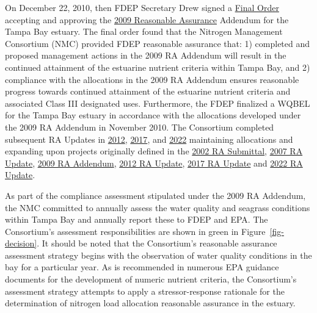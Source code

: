 \documentclass[
  letterpaper,
  DIV=11,
  numbers=noendperiod]{scrreprt}
\begin{document}
On December 22, 2010, then FDEP Secretary Drew signed a
\href{https://drive.google.com/file/d/1wV3w8ack_fLNK3yS-xTR7LTmziNtZ8CN/view?usp=share_link}{Final
Order} accepting and approving the
\href{https://drive.google.com/file/d/10IjJAfcGFf007a5VdPXAUtUi4dx-cmsA/view?usp=drivesdk}{2009
Reasonable Assurance} Addendum for the Tampa Bay estuary. The final
order found that the Nitrogen Management Consortium (NMC) provided FDEP
reasonable assurance that: 1) completed and proposed management actions
in the 2009 RA Addendum will result in the continued attainment of the
estuarine nutrient criteria within Tampa Bay, and 2) compliance with the
allocations in the 2009 RA Addendum ensures reasonable progress towards
continued attainment of the estuarine nutrient criteria and associated
Class III designated uses. Furthermore, the FDEP finalized a WQBEL for
the Tampa Bay estuary in accordance with the allocations developed under
the 2009 RA Addendum in November 2010. The Consortium completed
subsequent RA Updates in
\href{https://tbep.org/reasonable-assurance-plans-updates-2012/}{2012},
\href{https://tbep.org/reasonable-assurance-plans-updates-2017/}{2017},
and
\href{https://drive.google.com/file/d/18HHMx4U6vHNrFyepEFuoTJ_sEKyTA_gu/view?usp=share_link}{2022}
maintaining allocations and expanding upon projects originally defined
in the
\href{https://tbep.org/reasonable-assurance-plans-updates-2002/}{2002 RA
Submittal},
\href{https://tbep.org/reasonable-assurance-plans-updates-2007/}{2007 RA
Update},
\href{https://drive.google.com/file/d/10IjJAfcGFf007a5VdPXAUtUi4dx-cmsA/view?usp=drivesdk}{2009
RA Addendum},
\href{https://drive.google.com/file/d/1F_QmQcvGVQ78wK3jcMLMGmjs1vJ21nto/view?usp=share_link}{2012
RA Update},
\href{https://drive.google.com/file/d/1VdYE67_aZAhFq6JYQSKxx2WY2O5KwyUI/view?usp=share_link}{2017
RA Update} and
\href{https://drive.google.com/file/d/18HHMx4U6vHNrFyepEFuoTJ_sEKyTA_gu/view?usp=share_link}{2022
RA Update}.

As part of the compliance assessment stipulated under the 2009 RA
Addendum, the NMC committed to annually assess the water quality and
seagrass conditions within Tampa Bay and annually report these to FDEP
and EPA. The Consortium's assessment responsibilities are shown in green
in Figure~\ref{fig-decision}. It should be noted that the Consortium's
reasonable assurance assessment strategy begins with the observation of
water quality conditions in the bay for a particular year. As is
recommended in numerous EPA guidance documents for the development of
numeric nutrient criteria, the Consortium's assessment strategy attempts
to apply a stressor-response rationale for the determination of nitrogen
load allocation reasonable assurance in the estuary.
\end{document}
